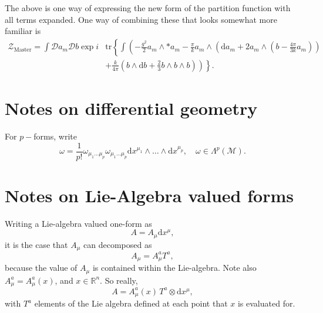 \documentclass{article}
\begin{document}
The above is one way of expressing the new form of the partition function with all terms expanded. One way of combining these that looks somewhat more familiar is
\begin{align}
    \mathcal{Z}_{\text{Master}}= \int \mathcal{D}a_{m}\mathcal{D}b\exp i &\text{tr}\left\{\int \left(-\frac{g^{2}}{2}a_{m}\wedge * a_{m} -\frac{\pi}{k}a_{m}\wedge \left(\mathrm{d}a_{m}+2a_{m}\wedge \left(b-\frac{4\pi}{3k}a_{m}\right)
    \right)\right.\right. \nonumber\\
    & \left.\left. +\frac{k}{4\pi}\left(b\wedge \mathrm{d}b + \frac{2}{3}b\wedge b \wedge b\right) \right)\right\}.
\end{align}

\section{Notes on differential geometry}
For $p-$forms, write
\begin{equation}
    \omega = \frac{1}{p!}\omega_{\mu_{1}\ldots\mu_{p}}\omega_{\mu_{1}\ldots\mu_{p}}\mathrm{d}x^{\mu_{1}}\wedge \ldots\wedge\mathrm{d}x^{\mu_{p}},\quad \omega\in \Lambda^{p}\left(\mathcal{M}\right).
\end{equation}

\section{Notes on Lie-Algebra valued forms}
Writing a Lie-algebra valued one-form as 
\begin{equation}
    A = A_{\mu}\mathrm{d}x^{\mu},
\end{equation}
it is the case that $A_{\mu}$ can decomposed as 
\begin{equation}
    A_{\mu} = A_{\mu}^{a}T^{a},
\end{equation}
because the value of $A_{\mu}$ is contained within the Lie-algebra. Note also $A_{\mu}^{a} = A_{\mu}^{a}(x)$, and $x\in \mathbb{R}^{n}$. So really,
\begin{equation}
    A = A_{\mu}^{a}(x)\, T^{a}\otimes \mathrm{d}x^{\mu},
\end{equation}
with $T^{a}$ elements of the Lie algebra defined at each point that $x$ is evaluated for. \newline
\end{document}
